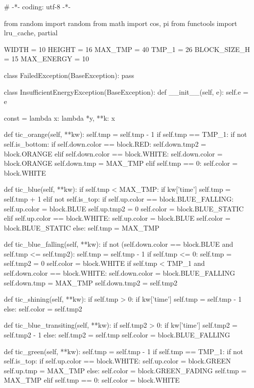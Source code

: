\documentclass[UTF8]{article}
\begin{document}
\begin{python}
# -*- coding: utf-8 -*-

from random import random
from math import cos, pi
from functools import lru_cache, partial

WIDTH = 10
HEIGHT = 16
MAX_TMP = 40
TMP_1 = 26
BLOCK_SIZE_H = 15
MAX_ENERGY = 10

class FailedException(BaseException):
    pass

class InsufficientEnergyException(BaseException):
    def __init__(self, e):
        self.e = e

const = lambda x: lambda *y, **k: x

def tic_orange(self, **kw):
    self.tmp = self.tmp - 1
    if self.tmp == TMP_1:
        if not self.is_bottom:
            if self.down.color == block.RED:
                self.down.tmp2 = block.ORANGE
            elif self.down.color == block.WHITE:
                self.down.color = block.ORANGE
                self.down.tmp   = MAX_TMP
    elif self.tmp == 0:
        self.color = block.WHITE

def tic_blue(self, **kw):
    if self.tmp < MAX_TMP:
        if kw['time'] %
            self.tmp = self.tmp + 1
    elif not self.is_top:
        if self.up.color == block.BLUE_FALLING:
            self.up.color = block.BLUE
            self.up.tmp2 = 0
            self.color = block.BLUE_STATIC
        elif self.up.color == block.WHITE:
            self.up.color = block.BLUE
            self.color = block.BLUE_STATIC
    else:
        self.tmp = MAX_TMP

def tic_blue_falling(self, **kw):
    if not (self.down.color == block.BLUE and self.tmp <= self.tmp2):
        self.tmp = self.tmp - 1
    if self.tmp <= 0:
        self.tmp = self.tmp2 = 0
        self.color = block.WHITE
    if self.tmp < TMP_1 and self.down.color == block.WHITE:
        self.down.color = block.BLUE_FALLING
        self.down.tmp = MAX_TMP
        self.down.tmp2  = self.tmp2

def tic_shining(self, **kw):
    if self.tmp > 0:
        if kw['time'] %
            self.tmp = self.tmp - 1
    else:
        self.color = self.tmp2

def tic_blue_transiting(self, **kw):
    if self.tmp2 > 0:
        if kw['time'] %
            self.tmp2 = self.tmp2 - 1
    else:
        self.tmp2 = self.tmp
        self.color = block.BLUE_FALLING

def tic_green(self, **kw):
    self.tmp = self.tmp - 1
    if self.tmp == TMP_1:
        if not self.is_top:
            if self.up.color == block.WHITE:
                self.up.color = block.GREEN
                self.up.tmp   = MAX_TMP
            else:
                self.color = block.GREEN_FADING
                self.tmp = MAX_TMP
    elif self.tmp == 0:
        self.color = block.WHITE
        

\end{python}
\end{document}
